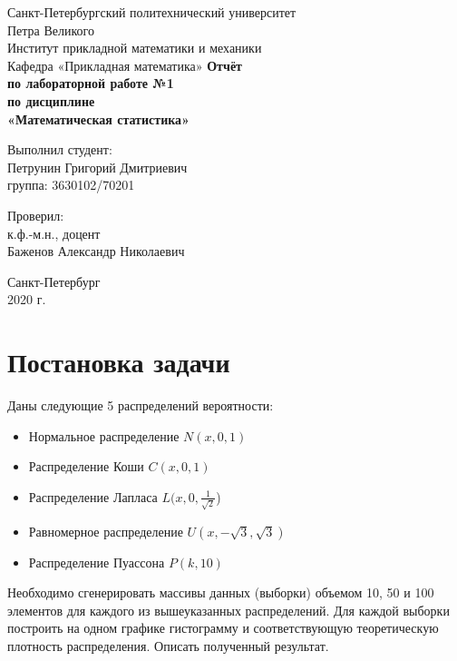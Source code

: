 \documentclass[12pt,a4paper]{article}
\begin{document}
	\begin{titlepage}
		\begin{center}		
			\vfill	
			Санкт-Петербургский политехнический университет \\
			Петра Великого\\
			\vskip 1cm
			Институт прикладной математики и механики \\
			Кафедра «Прикладная математика»
			\vfill
			\textbf{Отчёт\\
			по лабораторной работе №1\\
			по дисциплине\\
			«Математическая статистика»\\}
			\vfill
		\end{center}
		\vfill
		\hfill
		\begin{minipage}{0.4\textwidth}
			Выполнил студент:\\
			Петрунин Григорий Дмитриевич\\
			группа: 3630102/70201\\
		\end{minipage}
		\vfill
		\hfill 
		\begin{minipage}{0.4\textwidth}
			Проверил:\\
			к.ф.-м.н., доцент\\
			Баженов Александр Николаевич\
		\end{minipage}
		\vfill

		
		\begin{center}
			Санкт-Петербург\\2020 г.
		\end{center}
	\end{titlepage}

	\tableofcontents
	\newpage
	\section{Постановка задачи}
	Даны следующие 5 распределений вероятности:
	\begin{itemize}
		\item Нормальное распределение $\displaystyle N(x, 0, 1)$
		\item Распределение Коши $\displaystyle C(x, 0, 1)$
		\item Распределение Лапласа $\displaystyle L(x, 0, \frac{1}{\sqrt{2}}$)
		\item Равномерное распределение $\displaystyle U(x, -\sqrt{3}, \sqrt{3})$
		\item Распределение Пуассона $\displaystyle P(k, 10)$
	\end{itemize}
	Необходимо сгенерировать массивы данных (выборки) объемом 10, 50 и 100 элементов для каждого из вышеуказанных распределений. Для каждой выборки построить на одном графике гистограмму и соответствующую теоретическую плотность распределения. Описать полученный результат.
\end{document}
